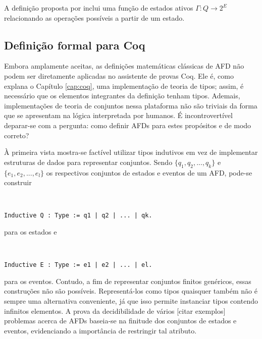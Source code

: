 A definição proposta por  inclui uma função de estados ativos $\Gamma : Q \to 2^E$ relacionando as operações possíveis a partir de um estado.

\subsection{Definição formal para Coq}

Embora amplamente aceitas, as definições matemáticas clássicas de AFD não podem ser diretamente aplicadas no assistente de provas Coq. Ele é, como explana o Capítulo \ref{cap:coq}, uma implementação de teoria de tipos; assim, é necessário que os elementos integrantes da definição tenham tipos. Ademais, implementações de teoria de conjuntos nessa plataforma não são triviais da forma que se apresentam na lógica interpretada por humanos. É incontrovertível deparar-se com a pergunta: como definir AFDs para estes propósitos e de modo correto?

À primeira vista mostra-se factível utilizar tipos indutivos em vez de implementar estruturas de dados para representar conjuntos. Sendo $\{ q_1, q_2, ..., q_k \}$ e $\{ e_1, e_2, ..., e_l \}$ os respectivos conjuntos de estados e eventos de um AFD, pode-se construir

\begin{equation}\end{equation}\label{eq:Q_inductive}
\\[-4\baselineskip]
\begin{verbatim}
Inductive Q : Type := q1 | q2 | ... | qk.
\end{verbatim}

\noindent
para os estados e

\begin{equation}\end{equation}\label{eq:E_inductive}
\\[-4\baselineskip]
\begin{verbatim}
Inductive E : Type := e1 | e2 | ... | el.
\end{verbatim}

\noindent
para os eventos. Contudo, a fim de representar conjuntos finitos genéricos, essas construções não são possíveis. Representá-los como tipos quaisquer também não é sempre uma alternativa conveniente, já que isso permite instanciar tipos contendo infinitos elementos. A prova da decidibilidade de vários [citar exemplos] problemas acerca de AFDs baseia-se na finitude dos conjuntos de estados e eventos, evidenciando a importância de restringir tal atributo.

